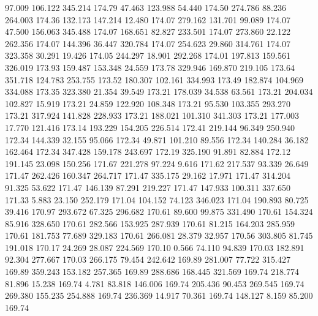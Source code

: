   97.009  106.122  345.214       174.79
  47.463  123.988   54.440       174.50
 274.786   88.236  264.003       174.36
 132.173  147.214   12.480       174.07
 279.162  131.701   99.089       174.07
  47.500  156.063  345.488       174.07
 168.651   82.827  233.501       174.07
 273.860   22.122  262.356       174.07
 144.396   36.447  320.784       174.07
 254.623   29.860  314.761       174.07
 323.358   30.291   19.426       174.05
 244.297   18.901  292.268       174.01
 197.813  159.561  326.019       173.93
 159.487  153.348   24.559       173.78
 329.946  169.870  219.105       173.64
 351.718  124.783  253.755       173.52
 180.307  102.161  334.993       173.49
 182.874  104.969  334.088       173.35
 323.380   21.354   39.549       173.21
 178.039   34.538   63.561       173.21
 204.034  102.827   15.919       173.21
  24.859  122.920  108.348       173.21
  95.530  103.355  293.270       173.21
 317.924  141.828  228.933       173.21
 188.021  101.310  341.303       173.21
 177.003   17.770  121.416       173.14
 193.229  154.205  226.514       172.41
 219.144   96.349  250.940       172.34
 144.339   32.155   95.066       172.34
  49.871  101.210   89.556       172.34
 140.284   36.182  162.464       172.34
 347.428  159.178  243.697       172.19
 325.190   91.891   82.884       172.12
 191.145   23.098  150.256       171.67
 221.278   97.224    9.616       171.62
 217.537   93.339   26.649       171.47
 262.426  160.347  264.717       171.47
 335.175   29.162   17.971       171.47
 314.204   91.325   53.622       171.47
 146.139   87.291  219.227       171.47
 147.933  100.311  337.650       171.33
   5.883   23.150  252.179       171.04
 104.152   74.123  346.023       171.04
 190.893   80.725   39.416       170.97
 293.672   67.325  296.682       170.61
  89.600   99.875  331.490       170.61
 154.324   85.916  328.650       170.61
 282.566  153.925  287.939       170.61
  81.215  164.203  285.959       170.61
 181.753   77.689  329.183       170.61
 266.081   28.379   32.957       170.56
 303.805   81.745  191.018       170.17
  24.269   28.087  224.569       170.10
   0.566   74.110   94.839       170.03
 182.891   92.304  277.667       170.03
 266.175   79.454  242.642       169.89
 281.007   77.722  315.427       169.89
 359.243  153.182  257.365       169.89
 288.686  168.445  321.569       169.74
 218.774   81.896   15.238       169.74
   4.781   83.818  146.006       169.74
 205.436   90.453  269.545       169.74
 269.380  155.235  254.888       169.74
 236.369   14.917   70.361       169.74
 148.127    8.159   85.200       169.74
